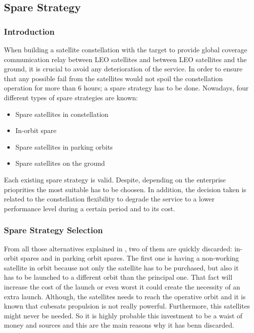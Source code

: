 \subsection{Spare Strategy}

\subsubsection{Introduction}
When building a satellite constellation with the target to provide global coverage communication relay between LEO satellites and between LEO satellites and the ground, it is crucial to avoid any deterioration of the service. In order to ensure that any possible fail from the satellites would not spoil the constellation operation for more than 6 hours; a spare strategy has to be done. Nowadays, four different types of spare strategies are known:

\begin{itemize} 
\item {Spare satellites in constellation}
\item {In-orbit spare} 
\item {Spare satellites in parking orbits} 
\item {Spare satellites on the ground} 
\end{itemize}

Each existing spare strategy is valid. Despite, depending on the enterprise prioprities the most suitable has to be choosen. In addition, the decision taken is related to the constellation flexibility to degrade the service to a lower performance level during a certain period and to its cost. 

\subsubsection{Spare Strategy Selection}
From all those alternatives explained in \cite[Chapter 1, Section 4]{annex2}, two of them  are quickly discarded: in-orbit spares and in parking orbit spares. The first one is having a non-working satellite in orbit because not only the satellite has to be purchased, but also it has to be launched to a different orbit than the principal one. That fact will increase the cost of the launch or even worst it could create the necessity of an extra launch. Although, the satellites needs to reach the operative orbit and it is known that cubesats propulsion is not really powerful. Furthermore, this satellites might never be needed. So it is highly probable this investment to be a waist of money and sources and this are the main reasons why it has benn discarded.

